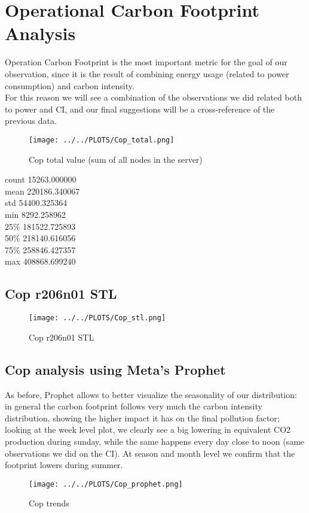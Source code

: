\section{Operational Carbon Footprint Analysis}
Operation Carbon Footprint is the most important metric for the goal of our observation, since it is the result of combining energy usage (related to power consumption) and carbon intensity. \\
For this reason we will see a combination of the observations we did related both to power and CI, and our final suggestions will be a cross-reference of the previous data.

\vspace{-15pt}

\begin{figure}[H]
\centering
\texttt{[image: ../../PLOTS/Cop\_total.png]}
\captionsetup{skip=-10pt}
\caption{Cop total value (sum of all nodes in the server)}
\label{fig:Cop_total}
\end{figure}

\begin{center}
count     15263.000000 \\
mean     220186.340067 \\
std       54400.325364 \\
min        8292.258962 \\
25\%      181522.725893 \\
50\%      218140.616056 \\
75\%      258846.427357 \\
max      408868.699240   
\end{center}

\subsection{Cop r206n01 STL}

\vspace{-10pt}

\begin{figure}[H]
\centering
\texttt{[image: ../../PLOTS/Cop\_stl.png]}
\caption{Cop r206n01 STL}
\label{fig:Cop_r206n01_stl}
\end{figure}

\subsection{Cop analysis using Meta's Prophet}
As before, Prophet allows to better visualize the seasonality of our distribution: \\
in general the carbon footprint follows very much the carbon intensity distribution, showing the higher impact it has on the final pollution factor;
looking at the week level plot, we clearly see a big lowering in equivalent CO2 production during sunday, while the same happens every day close to noon (same observations we did on the CI). 
At season and month level we confirm that the footprint lowers during summer.

\vspace{-10pt}

\begin{figure}[H]
\centering
\texttt{[image: ../../PLOTS/Cop\_prophet.png]}
\caption{Cop trends}
\label{fig:Cop_prophet}
\end{figure}
